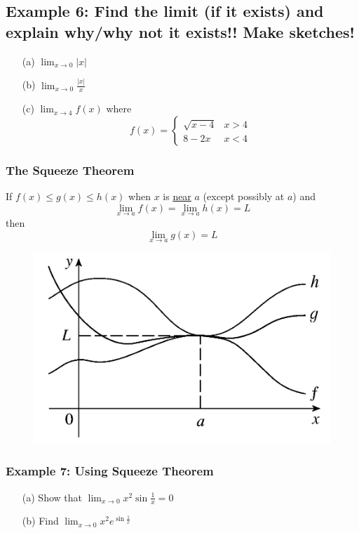 \documentclass[10pt]{book}
\theoremstyle{definition}
\begin{document}
\subsection*{Example 6: Find the limit (if it exists) and explain why/why not it exists!! Make sketches!}
\begin{itemize}
    \item[(a)] $\displaystyle \lim_{x\rightarrow 0}|x|$\vspace{2in}
    \item[(b)] $\displaystyle \lim_{x\rightarrow 0}\frac{|x|}{x}$\vspace{2in}
    \item[(c)] $\displaystyle \lim_{x\rightarrow 4}f(x)$ where
    \[
    f(x)=\begin{cases}
    \sqrt{x-4} & x>4\\
    8-2x & x<4
    \end{cases}
    \]
\end{itemize}
\clearpage
\begin{tcolorbox}
\subsubsection*{The Squeeze Theorem}
If $f(x)\leq g(x)\leq h(x)$ when $x$ is \underline{near} $a$ (except possibly at $a$) and
\[
\lim_{x\rightarrow a}f(x)=\lim_{x\rightarrow a}h(x)=L
\]
then
\[
\lim_{x\rightarrow a}g(x)= L
\]
\end{tcolorbox}
\begin{figure}[h!]
    \includegraphics[scale=0.35]{fig2.png}
\end{figure}
\subsubsection*{Example 7: Using Squeeze Theorem}
\begin{itemize}
    \item[(a)] Show that $\displaystyle\lim_{x\rightarrow 0 }x^2\sin\frac{1}{x}=0$\vspace{2in}
    \item[(b)] Find $\displaystyle\lim_{x\rightarrow 0}x^2e^{\sin\frac{1}{x}}$
\end{itemize}
\end{document}
